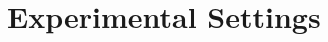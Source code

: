 \documentclass{article} %
\newtheorem{theorem}{Theorem}
\newtheorem{definition}{Definition}
\begin{document}
%
%
%
\section{Experimental Settings}\label{sec:experimental_settings}
%
\end{document}
